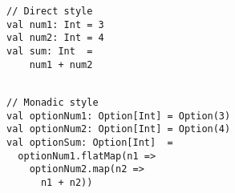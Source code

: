 \begin{algorithm}

\begin{minipage}{0.35\textwidth}
\begin{verbatim}
// Direct style
val num1: Int = 3
val num2: Int = 4
val sum: Int  =
    num1 + num2
    

\end{verbatim}
\end{minipage}
%
%
\begin{minipage}{0.45\textwidth}
\begin{verbatim}
// Monadic style
val optionNum1: Option[Int] = Option(3)
val optionNum2: Option[Int] = Option(4)
val optionSum: Option[Int]  =
  optionNum1.flatMap(n1 =>
    optionNum2.map(n2 =>
      n1 + n2))
\end{verbatim}
\end{minipage}
    
\caption{Direct vs. monadic syntax in Scala %
\label{monad:syntax}}
\end{algorithm}
